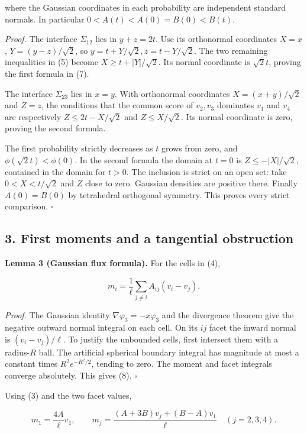 \documentclass[
  11pt,
]{article}
\begin{document}
where the Gaussian coordinates in each probability are independent
standard normals. In particular \(0<A(t)<A(0)=B(0)<B(t)\).

\emph{Proof.} The interface \(\Sigma_{12}\) lies in \(y+z=2t\). Use its
orthonormal coordinates \(X=x\), \(Y=(y-z)/\sqrt2\), so
\(y=t+Y/\sqrt2,z=t-Y/\sqrt2\). The two remaining inequalities in (5)
become \(X\ge t+|Y|/\sqrt2\). Its normal coordinate is \(\sqrt2t\),
proving the first formula in (7).

The interface \(\Sigma_{23}\) lies in \(x=y\). With orthonormal
coordinates \(X=(x+y)/\sqrt2\) and \(Z=z\), the conditions that the
common score of \(v_2,v_3\) dominates \(v_1\) and \(v_4\) are
respectively \(Z\le2t-X/\sqrt2\) and \(Z\le X/\sqrt2\). Its normal
coordinate is zero, proving the second formula.

The first probability strictly decreases as \(t\) grows from zero, and
\(\phi(\sqrt2t)<\phi(0)\). In the second formula the domain at \(t=0\)
is \(Z\le-|X|/\sqrt2\), contained in the domain for \(t>0\). The
inclusion is strict on an open set: take \(0<X<t/\sqrt2\) and \(Z\)
close to zero. Gaussian densities are positive there. Finally
\(A(0)=B(0)\) by tetrahedral orthogonal symmetry. This proves every
strict comparison. \(\square\)

\subsection{3. First moments and a tangential
obstruction}\label{first-moments-and-a-tangential-obstruction}

\textbf{Lemma 3 (Gaussian flux formula).} For the cells in (4),

\[
 m_i=\frac1\ell\sum_{j\ne i} A_{ij}(v_i-v_j).              \tag{8}
\]

\emph{Proof.} The Gaussian identity \(\nabla\varphi_3=-x\varphi_3\) and
the divergence theorem give the negative outward normal integral on each
cell. On its \(ij\) facet the inward normal is \((v_i-v_j)/\ell\). To
justify the unbounded cells, first intersect them with a radius-\(R\)
ball. The artificial spherical boundary integral has magnitude at most a
constant times \(R^2e^{-R^2/2}\), tending to zero. The moment and facet
integrals converge absolutely. This gives (8). \(\square\)

Using (3) and the two facet values,

\[
 m_1=\frac{4A}{\ell}v_1,\qquad
 m_j=\frac{(A+3B)v_j+(B-A)v_1}{\ell}\quad(j=2,3,4).       \tag{9}
\]
\end{document}
